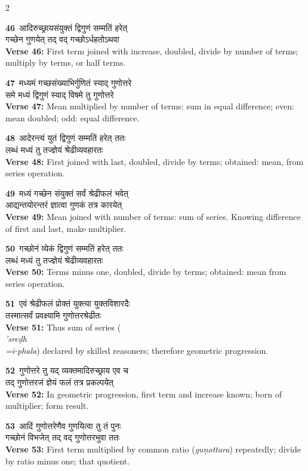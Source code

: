 \documentclass[11pt,a4paper]{article}
\newcommand{\dev}[1]{{\devanagarifont #1}}
\newcommand{\iast}[1]{\textit{#1}}
\newcommand{\vnum}[1]{\textcolor{versenumbercolor}{\textbf{#1}}}
\begin{document}
\begin{paracol}{2}

\switchcolumn[0]
\vnum{46}\ \dev{आदिरुच्छ्रायसंयुक्तं द्विगुणं सम्मतिं हरेत्}\\
\dev{गच्छेन गुणयेत् तद् वद् गच्छोऽर्धहतोऽथवा}\\
\switchcolumn[1]
\textbf{Verse 46:} First term joined with increase, doubled, divide by number of terms; multiply by terms, or half terms.

\switchcolumn[0]
\vnum{47}\ \dev{मध्यमं गच्छसंख्याभिर्गुणितं स्याद् गुणोत्तरे}\\
\dev{समे मध्यं द्विगुणं स्याद् विषमे तु गुणोत्तरे}\\
\switchcolumn[1]
\textbf{Verse 47:} Mean multiplied by number of terms: sum in equal difference; even: mean doubled; odd: equal difference.

\switchcolumn[0]
\vnum{48}\ \dev{आदेरन्त्यं युतं द्विगुणं सम्मतिं हरेत् ततः}\\
\dev{लब्धं मध्यं तु तज्ज्ञेयं श्रेढीव्यवहारतः}\\
\switchcolumn[1]
\textbf{Verse 48:} First joined with last, doubled, divide by terms; obtained: mean, from series operation.

\switchcolumn[0]
\vnum{49}\ \dev{मध्यं गच्छेन संयुक्तं सर्वं श्रेढीफलं भवेत्}\\
\dev{आद्यन्तयोरन्तरं ज्ञात्वा गुणकं तत्र कारयेत्}\\
\switchcolumn[1]
\textbf{Verse 49:} Mean joined with number of terms: sum of series. Knowing difference of first and last, make multiplier.

\switchcolumn[0]
\vnum{50}\ \dev{गच्छोनं व्येकं द्विगुणं सम्मतिं हरेत् ततः}\\
\dev{लब्धं मध्यं तु तज्ज्ञेयं श्रेढीव्यवहारतः}\\
\switchcolumn[1]
\textbf{Verse 50:} Terms minus one, doubled, divide by terms; obtained: mean from series operation.

\switchcolumn[0]
\vnum{51}\ \dev{एवं श्रेढीफलं प्रोक्तं युक्त्या युक्तविशारदैः}\\
\dev{तस्मात्सर्वं प्रवक्ष्यामि गुणोत्तरश्रेढीतः}\\
\switchcolumn[1]
\textbf{Verse 51:} Thus sum of series (\iast{\\'sre\d dh\\=i-phala}) declared by skilled reasoners; therefore geometric progression.

\switchcolumn[0]
\vnum{52}\ \dev{गुणोत्तरे तु यद् व्यक्तमादिरुच्छ्राय एव च}\\
\dev{तद् गुणोत्तरजं ज्ञेयं फलं तत्र प्रकल्पयेत्}\\
\switchcolumn[1]
\textbf{Verse 52:} In geometric progression, first term and increase known; born of multiplier; form result.

\switchcolumn[0]
\vnum{53}\ \dev{आदिं गुणोत्तरेणैव गुणयित्वा तु तं पुनः}\\
\dev{गच्छोनं विभजेत् तद् वद् गुणोत्तरभुवा ततः}\\
\switchcolumn[1]
\textbf{Verse 53:} First term multiplied by common ratio (\iast{gu\d nottara}) repeatedly; divide by ratio minus one; that quotient.

\end{paracol}
\end{document}
